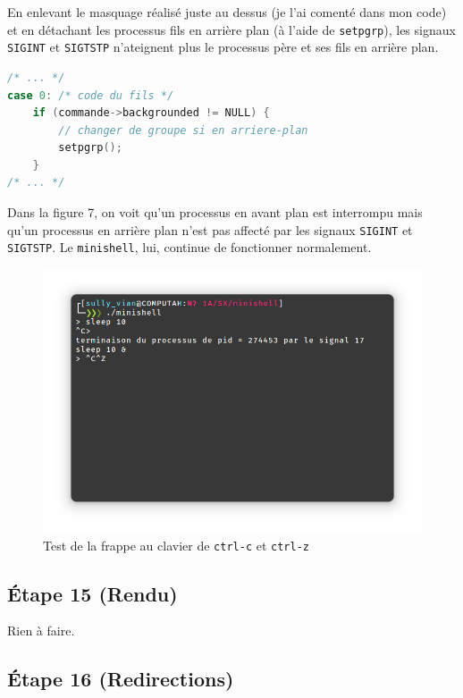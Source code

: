\documentclass{article}
\begin{document}
En enlevant le masquage réalisé juste au dessus (je l'ai comenté dans mon code) et en détachant les processus fils en arrière plan (à l'aide de \texttt{setpgrp}), les signaux \texttt{SIGINT} et \texttt{SIGTSTP} n'ateignent plus le processus père et ses fils en arrière plan.

\begin{lstlisting}[language=C, caption=ajout de la question 14]
/* ... */
case 0: /* code du fils */
    if (commande->backgrounded != NULL) {
        // changer de groupe si en arriere-plan
        setpgrp();
    }
/* ... */
\end{lstlisting}

Dans la figure 7, on voit qu'un processus en avant plan est interrompu mais qu'un processus en arrière plan n'est pas affecté par les signaux \texttt{SIGINT} et \texttt{SIGTSTP}. Le \texttt{minishell}, lui, continue de fonctionner normalement.

\begin{figure}[H]
    \centering
    \includegraphics[width=\textwidth]{./resources/E14.png}
    \caption{Test de la frappe au clavier de \texttt{ctrl-c} et \texttt{ctrl-z}}
    \label{fig:E14}
\end{figure}

\subsection*{Étape 15 (Rendu)}

Rien à faire.

\subsection*{Étape 16 (Redirections)}
\end{document}
